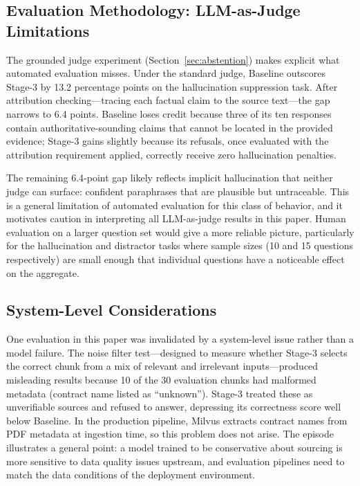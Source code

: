 \subsection{Evaluation Methodology: LLM-as-Judge Limitations}

The grounded judge experiment (Section~\ref{sec:abstention}) makes explicit
what automated evaluation misses.
Under the standard judge, Baseline outscores Stage-3 by 13.2 percentage points
on the hallucination suppression task.
After attribution checking---tracing each factual claim to the source
text---the gap narrows to 6.4 points.
Baseline loses credit because three of its ten responses contain
authoritative-sounding claims that cannot be located in the provided evidence;
Stage-3 gains slightly because its refusals, once evaluated with the
attribution requirement applied, correctly receive zero hallucination
penalties.

The remaining 6.4-point gap likely reflects implicit hallucination that neither
judge can surface: confident paraphrases that are plausible but untraceable.
This is a general limitation of automated evaluation for this class of
behavior, and it motivates caution in interpreting all LLM-as-judge results
in this paper.
Human evaluation on a larger question set would give a more reliable picture,
particularly for the hallucination and distractor tasks where sample sizes
(10 and 15 questions respectively) are small enough that individual questions
have a noticeable effect on the aggregate.

\subsection{System-Level Considerations}

One evaluation in this paper was invalidated by a system-level issue rather
than a model failure.
The noise filter test---designed to measure whether Stage-3 selects the correct
chunk from a mix of relevant and irrelevant inputs---produced misleading results
because 10 of the 30 evaluation chunks had malformed metadata (contract name
listed as ``unknown'').
Stage-3 treated these as unverifiable sources and refused to answer, depressing
its correctness score well below Baseline.
In the production pipeline, Milvus extracts contract names from PDF metadata at
ingestion time, so this problem does not arise.
The episode illustrates a general point: a model trained to be conservative
about sourcing is more sensitive to data quality issues upstream, and
evaluation pipelines need to match the data conditions of the deployment
environment.

